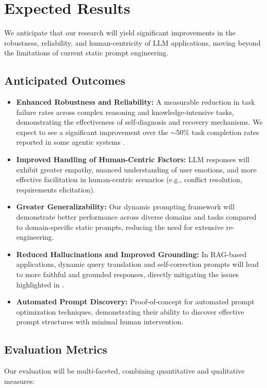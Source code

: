 \documentclass{article}
\begin{document}
\section{Expected Results}
We anticipate that our research will yield significant improvements in the robustness, reliability, and human-centricity of LLM applications, moving beyond the limitations of current static prompt engineering.

\subsection{Anticipated Outcomes}
\begin{itemize}
    \item \textbf{Enhanced Robustness and Reliability:} A measurable reduction in task failure rates across complex reasoning and knowledge-intensive tasks, demonstrating the effectiveness of self-diagnosis and recovery mechanisms. We expect to see a significant improvement over the $\sim$50\% task completion rates reported in some agentic systems \cite{paper1_agents}.
    \item \textbf{Improved Handling of Human-Centric Factors:} LLM responses will exhibit greater empathy, nuanced understanding of user emotions, and more effective facilitation in human-centric scenarios (e.g., conflict resolution, requirements elicitation).
    \item \textbf{Greater Generalizability:} Our dynamic prompting framework will demonstrate better performance across diverse domains and tasks compared to domain-specific static prompts, reducing the need for extensive re-engineering.
    \item \textbf{Reduced Hallucinations and Improved Grounding:} In RAG-based applications, dynamic query translation and self-correction prompts will lead to more faithful and grounded responses, directly mitigating the issues highlighted in \cite{paper5_legalrag}.
    \item \textbf{Automated Prompt Discovery:} Proof-of-concept for automated prompt optimization techniques, demonstrating their ability to discover effective prompt structures with minimal human intervention.
\end{itemize}

\subsection{Evaluation Metrics}
Our evaluation will be multi-faceted, combining quantitative and qualitative measures:
\end{document}
